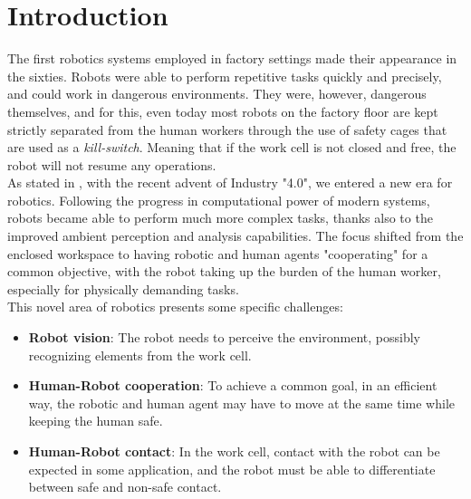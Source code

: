 
\chapter{Introduction}
\label{chap:first}
The first robotics systems employed in factory settings made their appearance in the sixties. Robots were able to perform repetitive tasks quickly and precisely, and could work in dangerous environments. They were, however, dangerous themselves, and for this, even today most robots on the factory floor are kept strictly separated from the human workers through the use of safety cages that are used as a \textit{kill-switch}. Meaning that if the work cell is not closed and free, the robot will not resume any operations.\\
\noindent As stated in \cite{industry_4p0_review}, with the recent advent of Industry "4.0", we entered a new era for robotics. Following the progress in computational power of modern systems, robots became able to perform much more complex tasks, thanks also to the improved ambient perception and analysis capabilities. The focus shifted from the enclosed workspace to having robotic and human agents "cooperating" for a common objective, with the robot taking up the burden of the human worker, especially for physically demanding tasks.\\
\noindent This novel area of robotics presents some specific challenges:
\begin{itemize}
	\item \textbf{Robot vision}: The robot needs to perceive the environment, possibly recognizing elements from the work cell.
	\item \textbf{Human-Robot cooperation}: To achieve a common goal, in an efficient way, the robotic and human agent may have to move at the same time while keeping the human safe. 
	\item \textbf{Human-Robot contact}: In the work cell, contact with the robot can be expected in some application, and the robot must be able to differentiate between safe and non-safe contact.
\end{itemize}
